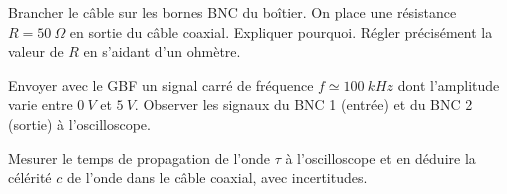  \begin{protocole}
 \item Brancher le câble sur les bornes BNC du boîtier. On place une résistance $R=\SI{50}{\Omega}$ en sortie du câble coaxial. Expliquer pourquoi. Régler précisément la valeur de $R$ en s’aidant d’un ohmètre.


 \item Envoyer avec le GBF un signal carré de fréquence $f \simeq \SI{100}{kHz}$ dont l’amplitude varie entre $\SI{0}{V}$ et $\SI{5}{V}$. Observer les signaux du BNC 1 (entrée) et du BNC 2 (sortie) à l’oscilloscope.
 \end{protocole}

 \label{sec:c}
 \begin{protocole}
 \item Mesurer le temps de propagation de l'onde $\tau$ à l’oscilloscope et en déduire la célérité $c$ de l'onde dans le câble coaxial, avec incertitudes.
 \end{protocole}


